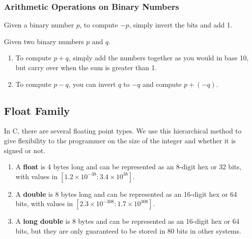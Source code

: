 \documentclass{article}
\begin{document}
    \subsubsection{Arithmetic Operations on Binary Numbers}

      \begin{theorem}
        Given a binary number $p$, to compute $-p$, simply invert the bits and add 1.
      \end{theorem}

      \begin{theorem}
        Given two binary numbers $p$ and $q$. 
        \begin{enumerate}
          \item To compute $p + q$, simply add the numbers together as you would in base 10, but carry over when the sum is greater than 1. 
          \item To compute $p - q$, you can invert $q$ to $-q$ and compute $p + (-q)$. 
        \end{enumerate}
      \end{theorem}


  \subsection{Float Family} 

  \begin{definition}
    In C, there are several floating point types. We use this hierarchical method to give flexibility to the programmer on the size of the integer and whether it is signed or not. 
    \begin{enumerate} 
      \item A \textbf{float} is 4 bytes long and can be represented as an 8-digit hex or 32 bits, with values in $[1.2 \times 10^{-38}: 3.4 \times 10^{38}]$. 
      \item A \textbf{double} is 8 bytes long and can be represented as an 16-digit hex or 64 bits, with values in $[2.3 \times 10^{-308}: 1.7 \times 10^{308}]$. 
      \item A \textbf{long double} is 8 bytes and can be represented as an 16-digit hex or 64 bits, but they are only guaranteed to be stored in 80 bits in other systems. 
    \end{enumerate}
  \end{definition}
\end{document}
